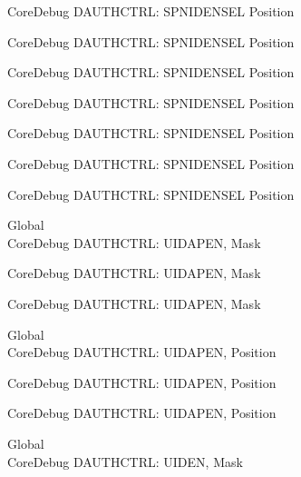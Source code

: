 \begin{DoxyRefList}
\label{deprecated__deprecated000141}%
%
Core\+Debug DAUTHCTRL\+: SPNIDENSEL Position 

\label{deprecated__deprecated000217}%
%
Core\+Debug DAUTHCTRL\+: SPNIDENSEL Position 

\label{deprecated__deprecated000280}%
%
Core\+Debug DAUTHCTRL\+: SPNIDENSEL Position 

\label{deprecated__deprecated000359}%
%
Core\+Debug DAUTHCTRL\+: SPNIDENSEL Position 

\label{deprecated__deprecated000435}%
%
Core\+Debug DAUTHCTRL\+: SPNIDENSEL Position 

\label{deprecated__deprecated000538}%
%
Core\+Debug DAUTHCTRL\+: SPNIDENSEL Position 

\label{deprecated__deprecated000640}%
%
Core\+Debug DAUTHCTRL\+: SPNIDENSEL Position  
\item[Global \doxylink{group___c_m_s_i_s___s_c_b_gad69e7195bbc5074466387d9c4d8bd529}{Core\+Debug\+\_\+\+DAUTHCTRL\+\_\+\+UIDAPEN\+\_\+\+Msk} ]\hfill \\
\label{deprecated__deprecated000082}%
%
Core\+Debug DAUTHCTRL\+: UIDAPEN, Mask 

\label{deprecated__deprecated000533}%
%
Core\+Debug DAUTHCTRL\+: UIDAPEN, Mask 

\label{deprecated__deprecated000635}%
%
Core\+Debug DAUTHCTRL\+: UIDAPEN, Mask  
\item[Global \doxylink{group___c_m_s_i_s___s_c_b_ga57a2ef70f6cc1e0903a8c3740512de46}{Core\+Debug\+\_\+\+DAUTHCTRL\+\_\+\+UIDAPEN\+\_\+\+Pos} ]\hfill \\
\label{deprecated__deprecated000081}%
%
Core\+Debug DAUTHCTRL\+: UIDAPEN, Position 

\label{deprecated__deprecated000532}%
%
Core\+Debug DAUTHCTRL\+: UIDAPEN, Position 

\label{deprecated__deprecated000634}%
%
Core\+Debug DAUTHCTRL\+: UIDAPEN, Position  
\item[Global \doxylink{group___c_m_s_i_s___s_c_b_ga7d84e1642469f5c20b7ef7fa76a4fe95}{Core\+Debug\+\_\+\+DAUTHCTRL\+\_\+\+UIDEN\+\_\+\+Msk} ]\hfill \\
\label{deprecated__deprecated000080}%
%
Core\+Debug DAUTHCTRL\+: UIDEN, Mask 


\end{DoxyRefList}

